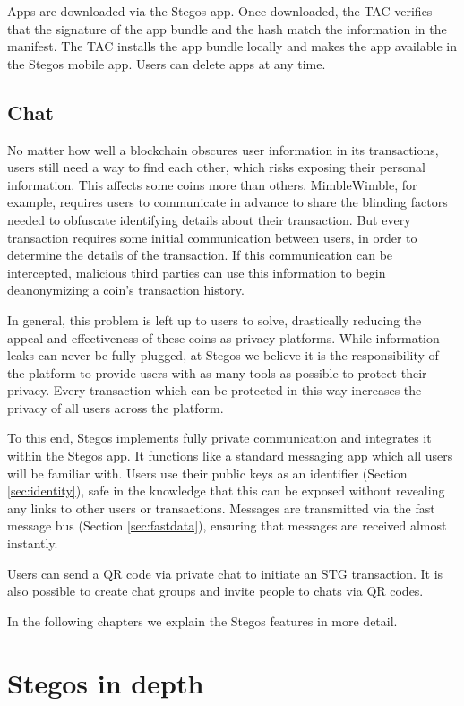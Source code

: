 \documentclass[8pt,fleqn,openany]{book}
\begin{document}
Apps are downloaded via the Stegos app. Once downloaded, the TAC verifies that the signature of the app bundle and the hash match the information in the manifest. The TAC installs the app bundle locally and makes the app available in the Stegos mobile app. Users can delete apps at any time.

\section{Chat}\label{sec:chat}
No matter how well a blockchain obscures user information in its transactions, users still need a way to find each other, which risks exposing their personal information. This affects some coins more than others. MimbleWimble, for example, requires users to communicate in advance to share the blinding factors needed to obfuscate identifying details about their transaction. But every transaction requires some initial communication between users, in order to determine the details of the transaction. If this communication can be intercepted, malicious third parties can use this information to begin deanonymizing a coin’s transaction history. 

In general, this problem is left up to users to solve, drastically reducing the appeal and effectiveness of these coins as privacy platforms. While information leaks can never be fully plugged, at Stegos we believe it is the responsibility of the platform to provide users with as many tools as possible to protect their privacy. Every transaction which can be protected in this way increases the privacy of all users across the platform.

To this end, Stegos implements fully private communication and integrates it within the Stegos app. It functions like a standard messaging app which all users will be familiar with. Users use their public keys as an identifier (Section \ref{sec:identity}), safe in the knowledge that this can be exposed without revealing any links to other users or transactions. Messages are transmitted via the fast message bus (Section \ref{sec:fastdata}), ensuring that messages are received almost instantly.

Users can send a QR code via private chat to initiate an STG transaction. It is also possible to create chat groups and invite people to chats via QR codes. 

In the following chapters we explain the Stegos features in more detail.

\chapter{Stegos in depth}\label{chap:stegos-in-depth}
\end{document}
